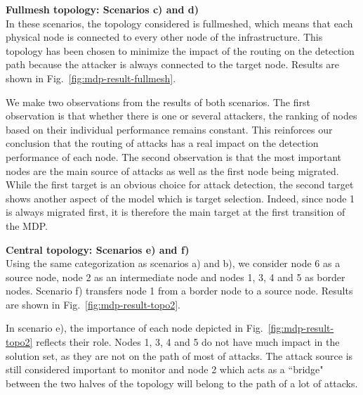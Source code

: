 \textbf{Fullmesh topology: Scenarios c) and d) \\}
In these scenarios, the topology considered is fullmeshed, which means that each physical node is connected to every other node of the infrastructure. This topology has been chosen to minimize the impact of the routing on the detection path because the attacker is always connected to the target node.
Results are shown in Fig.~\ref{fig:mdp-result-fullmesh}.

We make two observations from the results of both scenarios.
The first observation is that whether there is one or several attackers, the ranking of nodes based on their individual performance remains constant. This reinforces our conclusion that the routing of attacks has a real impact on the detection performance of each node.
The second observation is that the most important nodes are the main source of attacks as well as the first node being migrated. While the first target is an obvious choice for attack detection, the second target shows another aspect of the model which is target selection. Indeed, since node 1 is always migrated first, it is therefore the main target at the first transition of the MDP.



\textbf{Central topology: Scenarios e) and f) \\}
Using the same categorization as scenarios a) and b), we consider node 6 as a source node, node 2 as an intermediate node and nodes 1, 3, 4 and 5 as border nodes. Scenario f) transfers node 1 from a border node to a source node. Results are shown in Fig.~\ref{fig:mdp-result-topo2}.

In scenario e), the importance of each node depicted in Fig.~\ref{fig:mdp-result-topo2} reflects their role. Nodes 1, 3, 4 and 5 do not have much impact in the solution set, as they are not on the path of most of attacks. The attack source is still considered important to monitor and node 2 which acts as a ``bridge" between the two halves of the topology will belong to the path of a lot of attacks.

